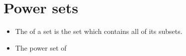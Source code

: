 \chapter{Power sets}
\label{power}

\begin{itemize}
\item
The  of a set is the set which contains all of its subsets.
\item
The power set of 

\end{itemize}
